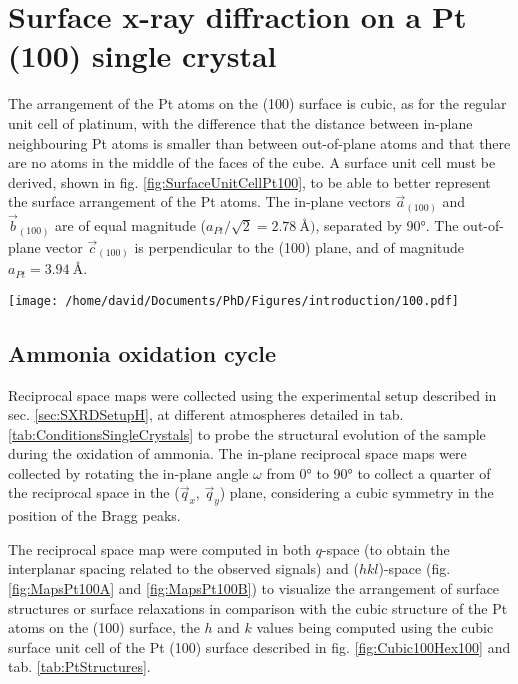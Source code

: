 \section{Surface x-ray diffraction on a Pt (100) single crystal} \label{sec:SXRD100}


The arrangement of the Pt atoms on the (100) surface is cubic, as for the regular unit cell of platinum, with the difference that the distance between in-plane neighbouring Pt atoms is smaller than between out-of-plane atoms and that there are no atoms in the middle of the faces of the cube.
A surface unit cell must be derived, shown in fig. \ref{fig:SurfaceUnitCellPt100}, to be able to better represent the surface arrangement of the Pt atoms.
The in-plane vectors $\vec{a}_{(100)}$ and $\vec{b}_{(100)}$ are of equal magnitude ($a_{Pt} / \sqrt{2} = \qty{2.78}{\angstrom})$, separated by \ang{90}.
The out-of-plane vector $\vec{c}_{(100)}$ is perpendicular to the (100) plane, and of magnitude $a_{Pt} = \qty{3.94}{\angstrom}$.

\begin{SCfigure}
    \centering
    \texttt{[image: /home/david/Documents/PhD/Figures/introduction/100.pdf]}
    \caption{
        Face-centered cubic unit cell of Pt with $(100)$ crystallographic plane drawn in green.
        $\vec{a}_{(100)}$, $\vec{b}_{(100)}$ and $\vec{c}_{(100)}$ are the (100) surface unit cell vectors.
    }
    \label{fig:SurfaceUnitCellPt100}
\end{SCfigure}

\subsection{Ammonia oxidation cycle}

Reciprocal space maps were collected using the experimental setup described in sec. \ref{sec:SXRDSetupH}, at different atmospheres detailed in tab. \ref{tab:ConditionsSingleCrystals} to probe the structural evolution of the sample during the oxidation of ammonia.
The in-plane reciprocal space maps were collected by rotating the in-plane angle $\omega$ from \ang{0} to \ang{90} to collect a quarter of the reciprocal space in the ($\vec{q}_x$, $\vec{q}_y$) plane, considering a cubic symmetry in the position of the Bragg peaks.

The reciprocal space map were computed in both $q$-space (to obtain the interplanar spacing related to the observed signals) and ($hkl$)-space (fig. \ref{fig:MapsPt100A} and \ref{fig:MapsPt100B}) to visualize the arrangement of surface structures or surface relaxations in comparison with the cubic structure of the Pt atoms on the (100) surface, the $h$ and $k$ values being computed using the cubic surface unit cell of the Pt (100) surface described in fig. \ref{fig:Cubic100Hex100} and tab. \ref{tab:PtStructures}.

